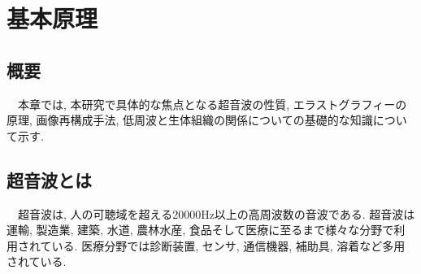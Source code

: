\chapter{基本原理}
\section{概要}
　本章では, 本研究で具体的な焦点となる超音波の性質, エラストグラフィーの原理, 画像再構成手法, 低周波と生体組織の関係についての基礎的な知識について示す.

\section{超音波とは}
　超音波は, 人の可聴域を超える20000Hz以上の高周波数の音波である. 超音波は運輸, 製造業, 建築, 水道, 農林水産, 食品そして医療に至るまで様々な分野で利用されている. 医療分野では診断装置, センサ, 通信機器, 補助具, 溶着など多用されている. 

